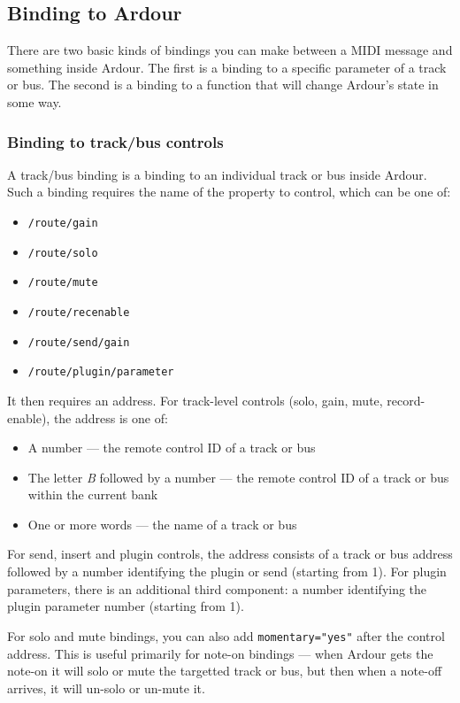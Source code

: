 \documentclass[10pt,a4paper]{book}
\begin{document}
{\subsection{Binding to Ardour}

There are two basic kinds of bindings you can make between a MIDI
message and something inside Ardour. The first is a binding to a
specific parameter of a track or bus. The second is a binding to a
function that will change Ardour's state in some way. 


\subsubsection{Binding to track/bus controls}

A track/bus binding is a binding to an individual track or bus inside
Ardour.  Such a binding requires the name of the property to control,
which can be one of:

\begin{itemize}
\item \texttt{/route/gain}
\item \texttt{/route/solo}
\item \texttt{/route/mute}
\item \texttt{/route/recenable}
\item \texttt{/route/send/gain}
\item \texttt{/route/plugin/parameter}
\end{itemize}

It then requires an address.  For track-level controls (solo, gain, mute, record-enable), the address is one of:

\begin{itemize}
\item A number --- the remote control ID of a track or bus
\item The letter \emph{B} followed by a number --- the remote control ID of a track or bus within the current bank
\item One or more words --- the name of a track or bus
\end{itemize}

For send, insert and plugin controls, the address consists of a track
or bus address followed by a number identifying the plugin or send
(starting from 1).  For plugin parameters, there is an additional third
component: a number identifying the plugin parameter number (starting
from 1).

For solo and mute bindings, you can also add \texttt{momentary="yes"} after the
control address. This is useful primarily for note-on bindings --- when
Ardour gets the note-on it will solo or mute the targetted track or
bus, but then when a note-off arrives, it will un-solo or un-mute it.

}
\end{document}
